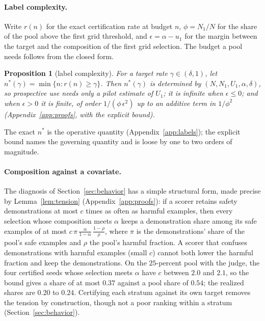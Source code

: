 \documentclass{article} %
\newtheorem{proposition}{Proposition}
\begin{document}
\paragraph{Label complexity.} Write $r(n)$ for the exact certification rate at budget $n$, $\phi = N_1 / N$ for the share of the pool above the first grid threshold, and $\epsilon = \alpha - u_1$ for the margin between the target and the composition of the first grid selection. The budget a pool needs follows from the closed form.
\begin{proposition}[label complexity]
\label{prop:labels}
For a target rate $\gamma \in (\delta, 1)$, let $n^{*}(\gamma) = \min\{n : r(n) \ge \gamma\}$. Then $n^{*}(\gamma)$ is determined by $(N, N_1, U_1, \alpha, \delta)$, so prospective use needs only a pilot estimate of $U_1$; it is infinite when $\epsilon \le 0$; and when $\epsilon > 0$ it is finite, of order $1 / (\phi\,\epsilon^{2})$ up to an additive term in $1 / \phi^{2}$ (Appendix~\ref{app:proofs}, with the explicit bound).
\end{proposition}
The exact $n^{*}$ is the operative quantity (Appendix~\ref{app:labels}); the explicit bound names the governing quantity and is loose by one to two orders of magnitude.

\paragraph{Composition against a covariate.} The diagnosis of Section~\ref{sec:behavior} has a simple structural form, made precise by Lemma~\ref{lem:tension} (Appendix~\ref{app:proofs}): if a scorer retains safety demonstrations at most $c$ times as often as harmful examples, then every selection whose composition meets $\alpha$ keeps a demonstration share among its safe examples of at most $c\,\pi\,\frac{\alpha}{1-\alpha}\,\frac{1-\rho}{\rho}$, where $\pi$ is the demonstrations' share of the pool's safe examples and $\rho$ the pool's harmful fraction. A scorer that confuses demonstrations with harmful examples (small $c$) cannot both lower the harmful fraction and keep the demonstrations. On the $25$-percent pool with the judge, the four certified seeds whose selection meets $\alpha$ have $c$ between $2.0$ and $2.1$, so the bound gives a share of at most $0.37$ against a pool share of $0.54$; the realized shares are $0.20$ to $0.24$. Certifying each stratum against its own target removes the tension by construction, though not a poor ranking within a stratum (Section~\ref{sec:behavior}).
\end{document}
